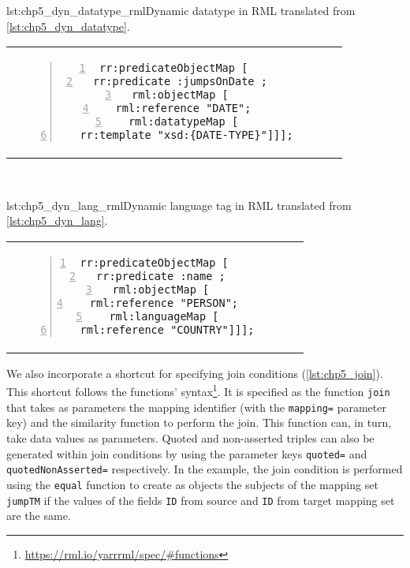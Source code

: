 \begin{minipage}{0.45\linewidth}
\begin{captionedlisting}{lst:chp5_dyn_datatype_rml}{Dynamic datatype in RML translated from \cref{lst:chp5_dyn_datatype}.}
\centering
\begin{tabular}{c}
\hspace{-1em}
{
\begin{lstlisting}[numbers=left,basicstyle=\ttfamily\small,columns=flexible,language=rmlstar]
rr:predicateObjectMap [ 
 rr:predicate :jumpsOnDate ;
 rml:objectMap [
  rml:reference "DATE";
  rml:datatypeMap [
   rr:template "xsd:{DATE-TYPE}"]]];
\end{lstlisting}
}
\end{tabular}
\end{captionedlisting}
\end{minipage}
\,\,\,\,\hfill
\begin{minipage}{0.45\linewidth}
\begin{captionedlisting}{lst:chp5_dyn_lang_rml}{Dynamic language tag in RML translated from \cref{lst:chp5_dyn_lang}.}
\centering
\begin{tabular}{c}
\hspace{0.5em}
{
\begin{lstlisting}[numbers=left,basicstyle=\ttfamily\small,columns=flexible,language=rmlstar]
rr:predicateObjectMap [ 
 rr:predicate :name ;
 rml:objectMap [
  rml:reference "PERSON";
  rml:languageMap [
   rml:reference "COUNTRY"]]];
\end{lstlisting}
}
\end{tabular}
\end{captionedlisting}
\end{minipage}


We also incorporate a shortcut for specifying join conditions (\cref{lst:chp5_join}). This shortcut follows the functions' syntax\footnote{\url{https://rml.io/yarrrml/spec/\#functions}}. %
It is specified as the function \texttt{join} that takes as parameters the mapping identifier (with the \texttt{mapping=} parameter key) and the similarity function to perform the join. 
This function can, in turn, take data values as parameters. 
Quoted and non-asserted triples can also be generated within join conditions by using the parameter keys \texttt{quoted=} and \texttt{quotedNonAsserted=} respectively.
In the example, the join condition is performed using the \texttt{equal} function to create as objects the subjects of the mapping set \texttt{jumpTM} if the values of the fields \texttt{ID} from source and \texttt{ID} from target mapping set are the same.

